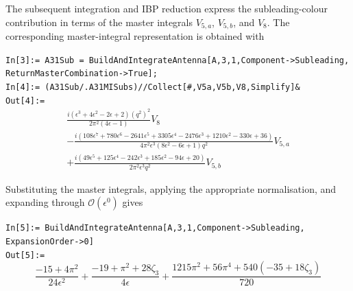 The subsequent integration and IBP reduction express the subleading-colour
contribution in terms of the master integrals $V_{5,a}$, $V_{5,b}$, and $V_8$. The
corresponding master-integral representation is obtained with

\begin{mdframed}[backgroundcolor=gray!10, linewidth=0pt]
\texttt{In[3]:= A31Sub = BuildAndIntegrateAntenna[A,3,1,Component->Subleading,\\ReturnMasterCombination->True];}\\
\texttt{In[4]:= (A31Sub/.A31MISubs)//Collect[\#,{V5a,V5b,V8},Simplify]\&}\\
\hfill
\texttt{Out[4]:=}
    \begin{equation*}
        \begin{gathered}
            \frac{i\left(\epsilon^3+4\epsilon^2-2\epsilon+2\right)\left(q^2\right)^2}{2\pi^2(4\epsilon-1)}V_8\\
            -\frac{i\left(108\epsilon^7+780\epsilon^6-2641\epsilon^5+3305\epsilon^4-2476\epsilon^3+1210\epsilon^2-330\epsilon+36\right)}{4\pi^2\epsilon^3\left(8\epsilon^2-6\epsilon+1\right)q^2}V_{5,a}\\
            +\frac{i\left(49\epsilon^5+125\epsilon^4-242\epsilon^3+185\epsilon^2-94\epsilon+20\right)}{2\pi^2\epsilon^3q^2}V_{5,b}
        \end{gathered}
    \end{equation*}
\end{mdframed}

Substituting the master integrals, applying the appropriate normalisation, and
expanding through $\mathcal O(\epsilon^0)$ gives

\begin{mdframed}[backgroundcolor=gray!10, linewidth=0pt]
\texttt{In[5]:= BuildAndIntegrateAntenna[A,3,1,Component->Subleading,\\ExpansionOrder->0]}\\
\hfill
\texttt{Out[5]:=}
    \begin{equation*}
        \frac{-15+4\pi^2}{24\epsilon^2}+\frac{-19+\pi^2+28\zeta_3}{4\epsilon}+\frac{1215\pi^2+56\pi^4+540(-35+18\zeta_3)}{720}
    \end{equation*}
\end{mdframed}

